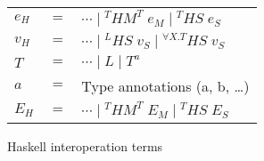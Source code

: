 \begin{figure}
\begin{center}
\begin{tabular}{lcl}
$e_{H}$ & $=$ & $\cdots\;\vert\;^{T}HM^{T}\;e_{M}\;\vert\;^{T}HS\;e_{S}$ \\
$v_{H}$ & $=$ & $\cdots\;\vert\;^{L}HS\;v_{S}\;\vert\;^{\forall X.T}HS\;v_{S}$ \\
$T$ & $=$ & $\cdots\;\vert\;L\;\vert\;T^{a}$ \\
$a$ & $=$ & Type annotations (a, b, \ldots) \\
$E_{H}$ & $=$ & $\cdots\;\vert\;^{T}HM^{T}\;E_{M}\;\vert\;^{T}HS\;E_{S}$
\end{tabular}
\end{center}
\caption{Haskell interoperation terms}
\label{fig:hit}
\end{figure}
